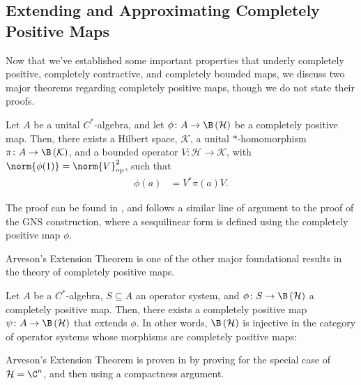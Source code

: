 \subsection{Extending and Approximating Completely Positive Maps}%
Now that we've established some important properties that underly completely positive, completely contractive, and completely bounded maps, we discuss two major theorems regarding completely positive maps, though we do not state their proofs.
\begin{theorem}\label{thm:stinespring_dilation}
  Let $A$ be a unital $C^{\ast}$-algebra, and let $\phi\colon A\rightarrow \B\left( \mathcal{H} \right)$ be a completely positive map. Then, there exists a Hilbert space, $\mathcal{K}$, a unital $\ast$-homomorphism $\pi\colon A\rightarrow \B\left( \mathcal{K} \right)$, and a bounded operator $V\colon \mathcal{H}\rightarrow \mathcal{K}$, with $\norm{\phi(1)} = \norm{V}_{\op}^2$, such that
  \begin{align*}
    \phi(a) &= V^{\ast}\pi(a)V.
  \end{align*}
\end{theorem}
The proof can be found in \cite[Chapter 4]{completely_bounded_maps_and_operator_algebras}, and follows a similar line of argument to the proof of the GNS construction, where a sesquilinear form is defined using the completely positive map $\phi$.\newline

Arveson's Extension Theorem is one of the other major foundational results in the theory of completely positive maps.
\begin{theorem}
  Let $A$ be a $C^{\ast}$-algebra, $S\subseteq A$ an operator system, and $\phi\colon S\rightarrow \B\left( \mathcal{H} \right)$ a completely positive map. Then, there exists a completely positive map $\psi\colon A\rightarrow \B\left( \mathcal{H} \right)$ that extends $\phi$. In other words, $\B\left( \mathcal{H} \right)$ is injective in the category of operator systems whose morphisms are completely positive maps:
  \begin{center}
  \end{center}
\end{theorem}
Arveson's Extension Theorem is proven in \cite[Chapter 7]{completely_bounded_maps_and_operator_algebras} by proving for the special case of $\mathcal{H} = \C^n$, and then using a compactness argument.\newline

